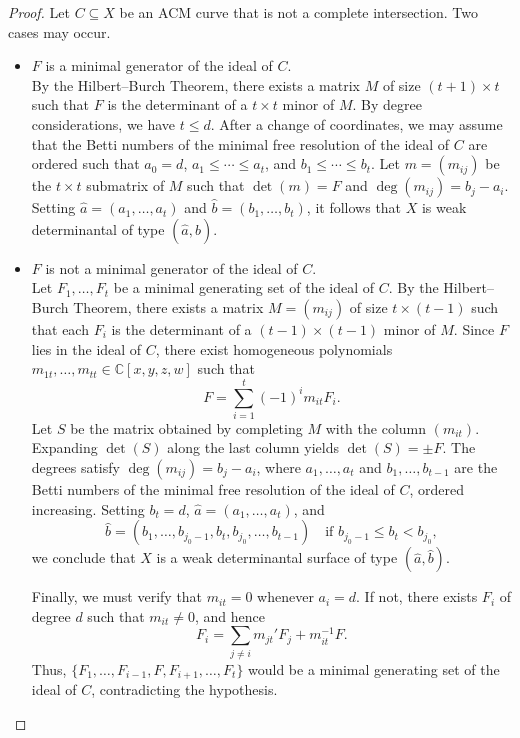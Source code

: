\documentclass[10pt,a4paper]{amsart}
\begin{document}
\begin{proof}
Let $C\subseteq X$ be an ACM curve that is not a complete intersection. Two cases may occur.

\begin{itemize}
\item[Case 1:] $F$ is a minimal generator of the ideal of $C$.\\
By the Hilbert--Burch Theorem, there exists a matrix $M$ of size $(t+1)\times t$ such that $F$ is the determinant of a $t\times t$ minor of $M$. By degree considerations, we have $t\leq d$. After a change of coordinates, we may assume that the Betti numbers of the minimal free resolution of the ideal of $C$ are ordered such that $a_{0}=d$, $a_{1}\leq\cdots\leq a_{t}$, and $b_{1}\leq\cdots\leq b_{t}$. Let $m=(m_{ij})$ be the $t\times t$ submatrix of $M$ such that $\det(m)=F$ and $\deg(m_{ij})=b_j-a_i$. Setting $\hat{a}=(a_1,\ldots,a_t)$ and $\hat{b}=(b_1,\ldots,b_t)$, it follows that $X$ is weak determinantal of type $(\hat{a},\hat{b})$.

\item[Case 2:] $F$ is not a minimal generator of the ideal of $C$.\\
Let $F_1,\ldots,F_t$ be a minimal generating set of the ideal of $C$. By the Hilbert--Burch Theorem, there exists a matrix $M=(m_{ij})$ of size $t\times(t-1)$ such that each $F_i$ is the determinant of a $(t-1)\times(t-1)$ minor of $M$. Since $F$ lies in the ideal of $C$, there exist homogeneous polynomials $m_{1t},\ldots,m_{tt}\in\mathds{C}[x,y,z,w]$ such that
\[
F=\sum_{i=1}^{t}(-1)^i m_{it}F_i.
\]
Let $S$ be the matrix obtained by completing $M$ with the column $(m_{it})$. Expanding $\det(S)$ along the last column yields $\det(S)=\pm F$. The degrees satisfy $\deg(m_{ij})=b_j-a_i$, where $a_1,\ldots,a_t$ and $b_1,\ldots,b_{t-1}$ are the Betti numbers of the minimal free resolution of the ideal of $C$, ordered increasing. Setting $b_t=d$, $\hat{a}=(a_1,\ldots,a_t)$, and
\[
\hat{b}=(b_1,\ldots,b_{j_0-1},b_t,b_{j_0},\ldots,b_{t-1})
\quad\text{if } b_{j_0-1}\leq b_t<b_{j_0},
\]
we conclude that $X$ is a weak determinantal surface of type $(\hat{a},\hat{b})$.

Finally, we must verify that $m_{it}=0$ whenever $a_i=d$. If not, there exists $F_i$ of degree $d$ such that $m_{it}\neq0$, and hence
\[
F_i=\sum_{j\neq i} m_{jt}'F_j + m_{it}^{-1}F.
\]
Thus, $\{F_1,\ldots,F_{i-1},F,F_{i+1},\ldots,F_t\}$ would be a minimal generating set of the ideal of $C$, contradicting the hypothesis.
\end{itemize}
\end{proof}
\end{document}
